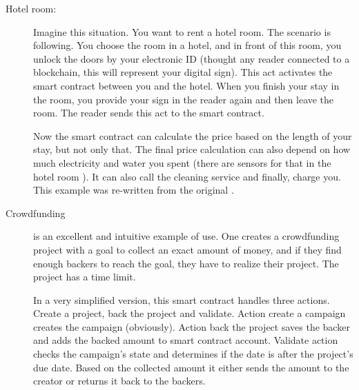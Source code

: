 \documentclass[thesis=M,english]{FITthesis}[2019/12/23]
\begin{document}
\begin{description}


\item [Hotel room:] Imagine this situation. You want to rent a hotel room. The scenario is following. You choose the room in a hotel, and in front of this room, you unlock the doors by your electronic ID (thought any reader connected to a blockchain, this will represent your digital sign). This act activates the smart contract between you and the hotel. When you finish your stay in the room, you provide your sign in the reader again and then leave the room. The reader sends this act to the smart contract.

Now the smart contract can calculate the price based on the length of your stay, but not only that. The final price calculation can also depend on how much electricity and water you spent (there are sensors for that in the hotel room ). It can also call the cleaning service and finally, charge you. This example was re-written from the original \cite{smartContractBibReview}.


\item [Crowdfunding] is an excellent and intuitive example of use. One creates a crowdfunding project with a goal to collect an exact amount of money, and if they find enough backers to reach the goal, they have to realize their project. The project has a time limit. 

In a very simplified version, this smart contract handles three actions. Create a project, back the project and validate. Action create a campaign creates the campaign (obviously). Action back the project saves the backer and adds the backed amount to smart contract account. Validate action checks the campaign's state and determines if the date is after the project's due date. Based on the collected amount it either sends the amount to the creator or returns it back to the backers.


\end{description}
\end{document}
